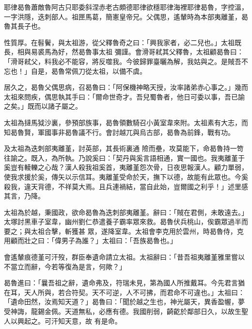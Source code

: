 
\begin{pinyinscope}

 耶律曷魯蕭敵魯阿古只耶委斜涅赤老古頗德耶律欲穩耶律海裡耶律曷魯，字控溫，一字洪隱，迭刺部人。祖匣馬葛，簡憲皇帝兄。父偶思，遙輦時為本部夷離堇，曷魯其長子也。



 性質厚。在髫鬢，與太祖游，從父釋魯奇之曰：「興我家者，必二兒也。」太祖既長，相與易裘馬為好，然曷魯事太祖
 彌謹。會滑哥弒其父釋魯，太祖顧曷魯曰：「滑哥弒父，料我必不能容，將反噬我。今彼歸罪臺曬為解，我姑與之。是賊吾不忘也！」自是，曷魯常佩刀從太祖，以備不虞。



 居久之，曷魯父偶思病，召曷魯曰：「阿保機神略天授，汝率諸弟赤心事之。」幾而太祖來問疾，偶思執其手曰：「爾命世奇才。吾兒蜀魯者，他日可委以事，吾已諭之矣。」既而以諸子屬之。



 太祖為撻馬狘沙裏，參預部族事，曷魯領數騎召小黃室韋來附。太祖素有大志，而知曷魯賢，軍國事非曷魯議不行。會討越兀與烏古部，曷魯為前鋒，戰有功。



 及太祖為迭刺部夷離堇，討英部，其長術裏通
 險而壘，攻莫能下，命曷魯持一笴往諭之。既入，為所執。乃說奚曰：「契丹與奚言語相通，實一國也。我夷離堇于奚豈有輘轢之心哉？漢人殺我祖奚首，夷離堇怨次骨，日夜思報漢人。顧力單弱，使我求援於奚，傳矢以示信耳。夷離堇受命於天，撫下以德，故能有此眾也。今奚殺我，違天背德，不祥莫大焉。且兵連禍結，當自此始，豈爾國之利乎！」述里感其言，乃降。



 太祖為於越，秉國政，欲命曷魯為迭刺部夷離堇。辭曰：「賊在君側，未敢遠去。」太塚討黑車子室韋，幽州劉仁恭遣養子霸率眾來救。曷魯伏兵桃山，俟霸眾過半而要之；與太祖合擊，斬獲甚
 眾，遂降室韋。太祖會李克用於雲州，時曷魯侍，克用顧而壯之曰：「偉男子為誰？」太祖曰：「吾族曷魯也。」



 會遙輦痕德堇可汗歿，群臣奉遺命請立太祖。太祖辭曰：「昔吾祖夷離堇雅里嘗以不當立而辭，今若等復為是言，何歟？」



 曷魯進曰：「曩吾祖之辭，遺命弗及，符瑞未見，第為國人所推戴耳。今先君言猶在耳，天人所與，若合符契。天不可逆，人不可拂，而君命不可違也。」太祖曰：「遺命田然，汝焉知天道？」曷魯曰：「聞於越之生也，神光屬天，異香盈幄，夢受神誨，龍錫金佩。天道無私，必應有德。我國削弱，齮齕於鄰部日久，以故生聖人以興起之。可汗知天意，故
 有是命。




\end{pinyinscope}
